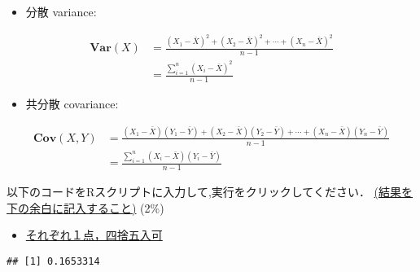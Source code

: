 \documentclass[11pt,]{problemset}
\newenvironment{Shaded}{\begin{snugshade}}{\end{snugshade}}
\newcommand{\CommentTok}[1]{\textcolor[rgb]{0.56,0.35,0.01}{\textit{#1}}}
\newcommand{\KeywordTok}[1]{\textcolor[rgb]{0.13,0.29,0.53}{\textbf{#1}}}
\newcommand{\NormalTok}[1]{#1}
\newcommand{\OperatorTok}[1]{\textcolor[rgb]{0.81,0.36,0.00}{\textbf{#1}}}
\newcommand{\StringTok}[1]{\textcolor[rgb]{0.31,0.60,0.02}{#1}}
\providecommand{\tightlist}{%
  \setlength{\itemsep}{0pt}\setlength{\parskip}{0pt}}
\begin{document}
\begin{itemize}
\tightlist
\item
  分散 variance:
\end{itemize}

\[
\begin{aligned}
\mathbf{Var}(X) & = \frac{(X_1-\bar{X})^2+(X_2-\bar{X})^2+\cdots+(X_n-\bar{X})^2}{n - 1} \\
                & = \frac{\sum_{i=1}^n(X_i-\bar{X})^2}{n -1}
\end{aligned}
\]

\begin{itemize}
\tightlist
\item
  共分散 covariance:
\end{itemize}

\[
\begin{aligned}
\mathbf{Cov}(X, Y) & = \frac{(X_1 - \bar{X})(Y_1-\bar{Y}) + (X_2 - \bar{X})(Y_2-\bar{Y}) + \cdots + (X_n - \bar{X})(Y_n-\bar{Y})}{n - 1} \\
                   & = \frac{\sum_{i = 1}^n(X_i - \bar{X})(Y_i-\bar{Y})}{n - 1}
\end{aligned}
\]

以下のコードをRスクリプトに入力して,実行をクリックしてください．\newline
\underline{(結果を下の余白に記入すること)} (2\%)

\begin{itemize}
\item
  \underline{それぞれ１点，四捨五入可}
\end{itemize}

\begin{Shaded}
\end{Shaded}

\begin{verbatim}
## [1] 0.1653314
\end{verbatim}

\begin{Shaded}
\end{Shaded}
\end{document}
